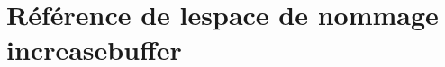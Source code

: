 \hypertarget{namespaceincreasebuffer}{}\section{Référence de l\textquotesingle{}espace de nommage increasebuffer}
\label{namespaceincreasebuffer}
